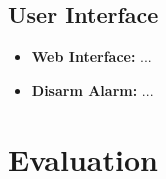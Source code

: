 \documentclass[conference]{IEEEtran}
\begin{document}
\subsection{User Interface}
\begin{itemize}
    \item \textbf{Web Interface:} ...
    \item \textbf{Disarm Alarm:} ...
\end{itemize}

\section{Evaluation}
\end{document}
